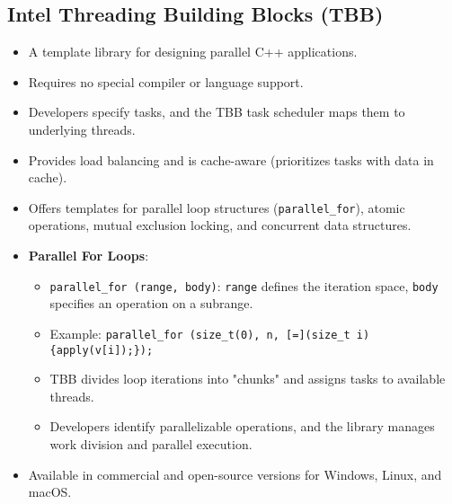 \subsection{Intel Threading Building Blocks (TBB)}
\begin{itemize}
    \item A template library for designing parallel C++ applications.
    \item Requires no special compiler or language support.
    \item Developers specify tasks, and the TBB task scheduler maps them to underlying threads.
    \item Provides load balancing and is cache-aware (prioritizes tasks with data in cache).
    \item Offers templates for parallel loop structures (\texttt{parallel\_for}), atomic operations, mutual exclusion locking, and concurrent data structures.
    \item \textbf{Parallel For Loops}:
        \begin{itemize}
            \item \texttt{parallel\_for (range, body)}: \texttt{range} defines the iteration space, \texttt{body} specifies an operation on a subrange.
            \item Example: \texttt{parallel\_for (size\_t(0), n, [=](size\_t i) \{apply(v[i]);\});}
            \item TBB divides loop iterations into "chunks" and assigns tasks to available threads.
            \item Developers identify parallelizable operations, and the library manages work division and parallel execution.
        \end{itemize}
    \item Available in commercial and open-source versions for Windows, Linux, and macOS.
\end{itemize}

